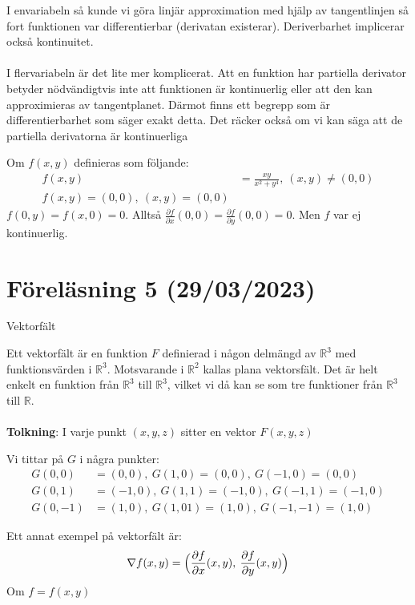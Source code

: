 \documentclass{report}
\begin{document}
\vspace{20pt}
\noindent
I envariabeln så kunde vi göra linjär approximation med hjälp av tangentlinjen så fort funktionen var differentierbar (derivatan existerar). Deriverbarhet implicerar också kontinuitet.\\\\

\noindent
I flervariabeln är det lite mer komplicerat. Att en funktion har partiella derivator betyder nödvändigtvis inte att funktionen är kontinuerlig eller att den kan approximieras av tangentplanet. Därmot finns ett begrepp som är differentierbarhet som säger exakt detta. Det räcker också om vi kan säga att de partiella derivatorna är kontinuerliga


\ex{}
{
Om $ f(x,y) $ definieras som följande:
\begin{align*}
	f(x,y) &= \frac{xy}{x^2+y^4}, \: (x,y) \ne (0,0)\\
	f(x,y) = (0,0), \: (x,y) = (0,0)
\end{align*}
$ f(0,y) = f(x,0) = 0 $. Alltså $ \frac{\partial f}{\partial x} (0,0) = \frac{\partial f}{\partial y}(0,0) =  0	$. Men $ f $ var ej kontinuerlig. 
}

\pagebreak
\section{Föreläsning 5 (29/03/2023)}
Vektorfält

{
	Ett vektorfält är en funktion $ F $ definierad i någon delmängd av $ \mathbb{R}^3 $ med funktionsvärden i $ \mathbb{R}^3 $. Motsvarande i $ \mathbb{R}^2 $ kallas plana vektorsfält. Det är helt enkelt en funktion från $ \mathbb{R}^3 $ till $ \mathbb{R}^3 $, vilket vi då kan se som tre funktioner från $ \mathbb{R}^3 $ till $ \mathbb{R} $.\\\\

\textbf{Tolkning}: I varje punkt $ (x,y,z) $ sitter en vektor $ F(x,y,z) $
}

{
Vi tittar på $ G $ i några punkter:
\begin{align*}
	G(0,0) &= (0,0), \: G(1,0) = (0,0), \: G(-1, 0) = (0,0)\\
	G(0,1) &= (-1,0), \: G(1,1) = (-1,0), \: G(-1,1) = (-1,0) \\
	G(0,-1) &= (1,0), \: G(1,01) = (1,0), \: G(-1,-1) = (1,0)
\end{align*}
}

\ex{}
{
Ett annat exempel på vektorfält är:
\begin{equation*}
\nabla f(x,y) = \Bigl( \frac{\partial f}{\partial x}(x,y), \: \frac{\partial f}{\partial y}(x,y)  \Bigr)
\end{equation*}
Om $ f = f(x,y) $ 
}
\end{document}
